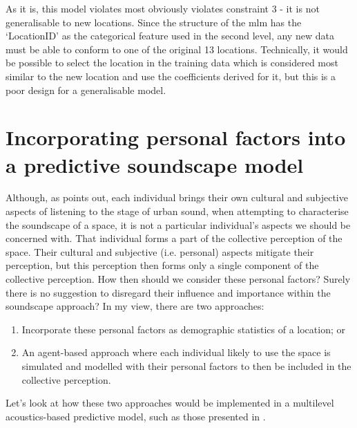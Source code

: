 As it is, this model violates most obviously violates constraint 3 - it is not generalisable to new locations. Since the structure of the \gls{mlm} has the `LocationID' as the categorical feature used in the second level, any new data must be able to conform to one of the original 13 locations. Technically, it would be possible to select the location in the training data which is considered most similar to the new location and use the coefficients derived for it, but this is a poor design for a generalisable model. 

\section{Incorporating personal factors into a predictive soundscape model}
Although, as \citet{Droumeva2021sound} points out, each individual brings their own cultural and subjective aspects of listening to the stage of urban sound, when attempting to characterise the soundscape of a space, it is not a particular individual's aspects we should be concerned with. That individual forms a part of the collective perception of the space. Their cultural and subjective (i.e. personal) aspects mitigate their perception, but this perception then forms only a single component of the collective perception. How then should we consider these personal factors? Surely there is no suggestion to disregard their influence and importance within the soundscape approach? In my view, there are two approaches:

\begin{enumerate}
  \item Incorporate these personal factors as demographic statistics of a location; or
  \item An agent-based approach where each individual likely to use the space is simulated and modelled with their personal factors to then be included in the collective perception.
\end{enumerate}

Let's look at how these two approaches would be implemented in a multilevel acoustics-based predictive model, such as those presented in .

